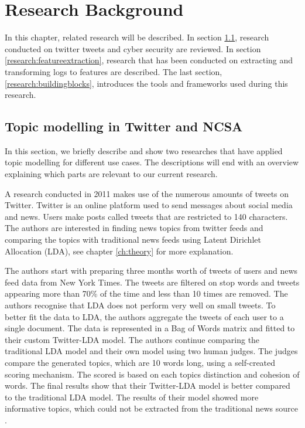 \chapter{Research Background}  \label{ch:research}

In this chapter, related research will be described. In section \ref{research:relatedwork}, research conducted on twitter tweets and cyber security are reviewed. In section \ref{research:featureextraction}, research that has been conducted on extracting and transforming logs to features are described. The last section, \ref{research:buildingblocks}, introduces the tools and frameworks used during this research.

\section{Topic modelling in Twitter and NCSA} \label{research:relatedwork}
In this section, we briefly describe and show two researches that have applied topic modelling for different use cases. The descriptions will end with an overview explaining which parts are relevant to our current research. 

\setlength{\parindent}{3ex} A research conducted in 2011 makes use of the numerous amounts of tweets on Twitter. Twitter is an online platform used to send messages about social media and news. Users make posts called tweets that are restricted to 140 characters. The authors are interested in finding news topics from twitter feeds and comparing the topics with traditional news feeds using Latent Dirichlet Allocation (LDA), see chapter \ref{ch:theory} for more explanation.

The authors start with preparing three months worth of tweets of users and news feed data from New York Times. The tweets are filtered on stop words and tweets appearing more than 70\% of the time and less than 10 times are removed. The authors recognise that LDA does not perform very well on small tweets. To better fit the data to LDA, the authors aggregate the tweets of each user to a single document. The data is represented in a Bag of Words matrix and fitted to their custom Twitter-LDA model. The authors continue comparing the traditional LDA model and their own model using two human judges. The judges compare the generated topics, which are 10 words long, using a self-created scoring mechanism. The scored is based on each topics distinction and cohesion of words. The final results show that their Twitter-LDA model is better compared to the traditional LDA model. The results of their model showed more informative topics, which could not be extracted from the traditional news source \cite{Zhao2011ComparingModels}. 

